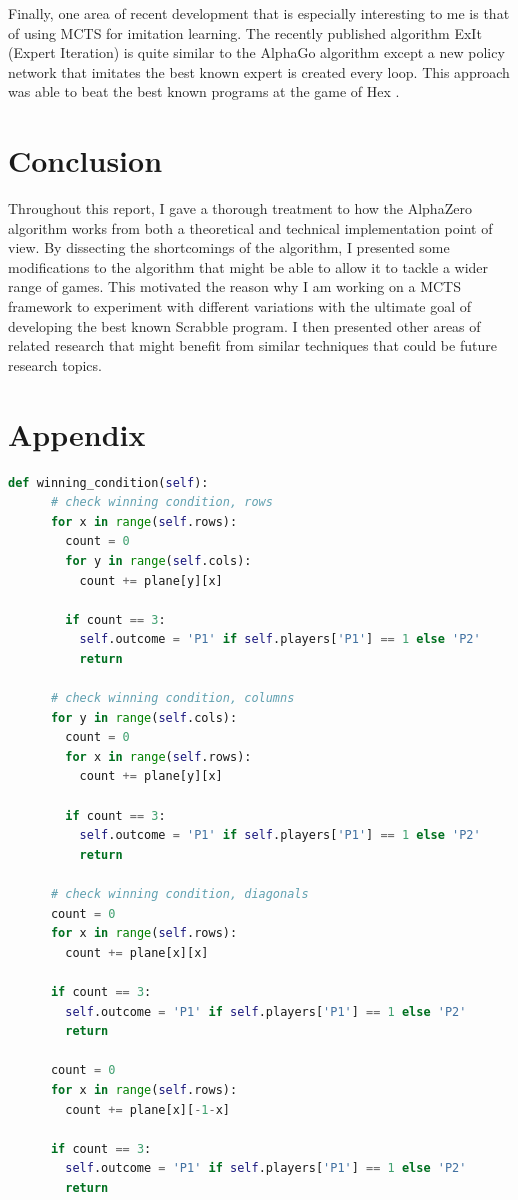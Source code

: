 \documentclass{article}
\begin{document}
  Finally, one area of recent development that is especially interesting to me is that of using MCTS for imitation learning. The recently published algorithm ExIt (Expert Iteration) is quite similar to the AlphaGo algorithm except a new policy network that imitates the best known expert is created every loop. This approach was able to beat the best known programs at the game of Hex \cite{anthony_thinking_2017}.

  \section{Conclusion}

  Throughout this report, I gave a thorough treatment to how the AlphaZero algorithm works from both a theoretical and technical implementation point of view. By dissecting the shortcomings of the algorithm, I presented some modifications to the algorithm that might be able to allow it to tackle a wider range of games. This motivated the reason why I am working on a MCTS framework to experiment with different variations with the ultimate goal of developing the best known Scrabble program. I then presented other areas of related research that might benefit from similar techniques that could be future research topics.

  \clearpage

   
  

  \clearpage

  \appendix

  \section*{Appendix}

  \lstset{basicstyle=\tiny}
  \begin{lstlisting}[language=Python]
    def winning_condition(self):
      # check winning condition, rows
      for x in range(self.rows):
        count = 0
        for y in range(self.cols):
          count += plane[y][x]

        if count == 3:
          self.outcome = 'P1' if self.players['P1'] == 1 else 'P2'
          return

      # check winning condition, columns
      for y in range(self.cols):
        count = 0
        for x in range(self.rows):
          count += plane[y][x]

        if count == 3:
          self.outcome = 'P1' if self.players['P1'] == 1 else 'P2'
          return

      # check winning condition, diagonals
      count = 0
      for x in range(self.rows):
        count += plane[x][x]

      if count == 3:
        self.outcome = 'P1' if self.players['P1'] == 1 else 'P2'
        return

      count = 0
      for x in range(self.rows):
        count += plane[x][-1-x]

      if count == 3:
        self.outcome = 'P1' if self.players['P1'] == 1 else 'P2'
        return

    \end{lstlisting}
  
\end{document}
